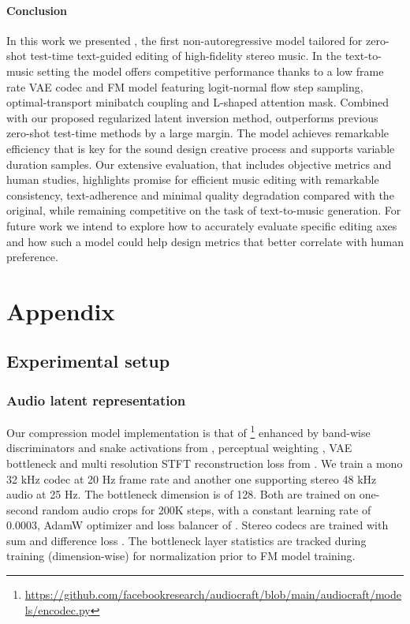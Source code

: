 \paragraph{Conclusion}

In this work we presented \proposed, the first non-autoregressive model tailored for zero-shot test-time text-guided editing of high-fidelity stereo music.
In the text-to-music setting the model offers competitive performance thanks to a low frame rate VAE codec and FM model featuring logit-normal flow step sampling, optimal-transport minibatch coupling and L-shaped attention mask.
Combined with our proposed regularized latent inversion method, \proposed outperforms previous zero-shot test-time methods by a large margin.
The model achieves remarkable efficiency that is key for the sound design creative process and supports variable duration samples.
Our extensive evaluation, that includes objective metrics and human studies, highlights \proposed promise for efficient music editing with remarkable consistency, text-adherence and minimal quality degradation compared with the original, while remaining competitive on the task of text-to-music generation.
For future work we intend to explore how to accurately evaluate specific editing axes and how such a model could help design metrics that better correlate with human preference.

\appendix
\section{Appendix}

\subsection{Experimental setup}
\label{apx:exp_setup}
\subsubsection{Audio latent representation}
\label{apx:latent}

Our compression model implementation is that of \cite{copet2024simple}\footnote{\url{https://github.com/facebookresearch/audiocraft/blob/main/audiocraft/models/encodec.py}} enhanced by band-wise discriminators and snake activations from \citet{kumar2024high}, perceptual weighting \citep{wright2019perceptual}, VAE bottleneck and multi resolution STFT reconstruction loss from \citet{evans2024fast}.
We train a mono 32 kHz codec at 20 Hz frame rate and another one supporting stereo 48 kHz audio at 25 Hz. The bottleneck dimension is of 128. Both are trained on one-second random audio crops for 200K steps, with a constant learning rate of 0.0003, AdamW optimizer and loss balancer of \citep{defossez2022high}.
Stereo codecs are trained with sum and difference loss \citep{steinmetz2020automatic}.
The bottleneck layer statistics are tracked during training (dimension-wise) for normalization prior to FM model training.

